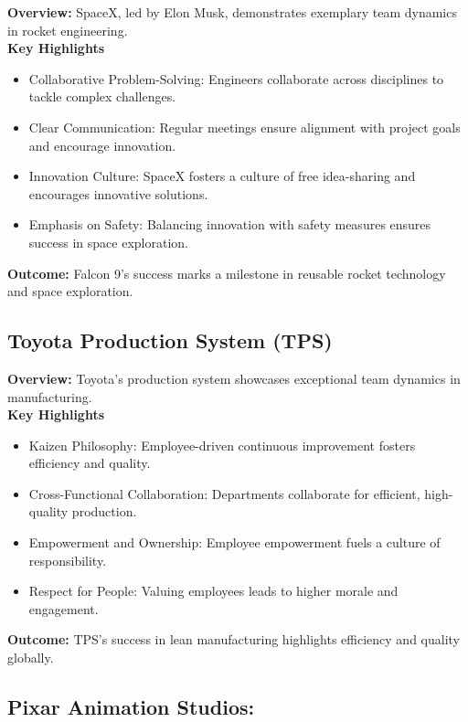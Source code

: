 \documentclass[a4paper, twoside]{article}
\begin{document}
\textbf{Overview:} SpaceX, led by Elon Musk, demonstrates exemplary team dynamics in rocket engineering.\\

\textbf{Key Highlights}
\begin{itemize}
    \item Collaborative Problem-Solving: Engineers collaborate across disciplines to tackle complex challenges.
    \item Clear Communication: Regular meetings ensure alignment with project goals and encourage innovation.
    \item Innovation Culture: SpaceX fosters a culture of free idea-sharing and encourages innovative solutions.
    \item Emphasis on Safety: Balancing innovation with safety measures ensures success in space exploration.
\end{itemize}

\textbf{Outcome:} Falcon 9's success marks a milestone in reusable rocket technology and space exploration.

\subsection*{Toyota Production System (TPS)}

\textbf{Overview:} Toyota's production system showcases exceptional team dynamics in manufacturing.\\

\textbf{Key Highlights}
\begin{itemize}
    \item Kaizen Philosophy: Employee-driven continuous improvement fosters efficiency and quality.
    \item Cross-Functional Collaboration: Departments collaborate for efficient, high-quality production.
    \item Empowerment and Ownership: Employee empowerment fuels a culture of responsibility.
    \item Respect for People: Valuing employees leads to higher morale and engagement.
\end{itemize}

\textbf{Outcome:} TPS's success in lean manufacturing highlights efficiency and quality globally.

\subsection*{Pixar Animation Studios:}
\end{document}
